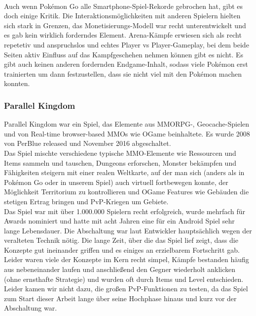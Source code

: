 \documentclass[extern,palatino]{cgBA}
\begin{document}
\\Auch wenn Pokémon Go alle Smartphone-Spiel-Rekorde gebrochen hat, gibt es doch einige Kritik. Die Interaktionsmöglichkeiten mit anderen Spielern hielten sich stark in Grenzen, das Monetisierungs-Modell war recht unterentwickelt und es gab kein wirklich forderndes Element. Arena-Kämpfe erwiesen sich als recht repetetiv und anspruchslos und echtes Player vs Player-Gameplay, bei dem beide Seiten aktiv Einfluss auf das Kampfgeschehen nehmen können gibt es nicht. Es gibt auch keinen anderen fordernden Endgame-Inhalt, sodass viele Pokémon erst trainierten um dann festzustellen, dass sie nicht viel mit den Pokémon machen konnten. %
\newpage
\subsubsection{Parallel Kingdom}
Parallel Kingdom war ein Spiel, das Elemente aus MMORPG-, Geocache-Spielen und von Real-time browser-based MMOs wie OGame beinhaltete. Es wurde 2008 von PerBlue released und November 2016 abgeschaltet. 
\\Das Spiel mischte verschiedene typische MMO-Elemente wie Ressourcen und Items sammeln und tauschen, Dungeons erforschen, Monster bekämpfen und Fähigkeiten steigern mit einer realen Weltkarte, auf der man sich (anders als in Pokémon Go oder in unserem Spiel) auch virtuell fortbewegen konnte, der Möglichkeit Territorium zu kontrollieren und OGame Features wie Gebäuden die stetigen Ertrag bringen und PvP-Kriegen um Gebiete.\\Das Spiel war mit über 1.000.000 Spielern recht erfolgreich, wurde mehrfach für Awards nominiert und hatte mit acht Jahren eine für ein Android Spiel sehr lange Lebensdauer.  %
Die Abschaltung war laut Entwickler hauptsächlich wegen der veralteten Technik nötig. %
Die lange Zeit, über die das Spiel lief zeigt, dass die Konzepte gut ineinander griffen und es einiges an erzielbarem Fortschritt gab. Leider waren viele der Konzepte im Kern recht simpel, Kämpfe bestanden häufig aus nebeneinander laufen und anschließend den Gegner wiederholt anklicken (ohne ernsthafte Strategie) und wurden oft durch Items und Level entschieden. Leider kamen wir nicht dazu, die großen PvP-Funktionen zu testen, da das Spiel zum Start dieser Arbeit lange über seine Hochphase hinaus und kurz vor der Abschaltung war.
\end{document}
